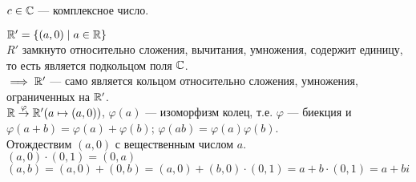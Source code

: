 \begin{normalsize}
\begin{defn}
    $c \in \mathbb{C}$ --- комплексное число.
\end{defn}

\begin{theorem-non}
    $\mathbb{R}' = \{(a, 0) \mid a \in \mathbb{R}\}$\\
    $R'$ замкнуто относительно сложения, вычитания, умножения, содержит единицу, то есть является подкольцом поля $\mathbb{C}$.\\
    $\implies \mathbb{R}'$ --- само является кольцом относительно сложения, умножения, ограниченных на $\mathbb{R}'$. \\
    $\mathbb{R} \overset{\varphi}{\to} \mathbb{R}'(a \mapsto (a, 0))$, $\varphi(a)$ --- изоморфизм колец, т.е. $\varphi$ --- биекция и $\varphi(a + b) = \varphi(a) + \varphi(b)$; $\varphi(ab) = \varphi(a)\varphi(b)$.\\
    Отождествим $(a, 0)$ с вещественным числом $a$.\\
    $(a, 0) \cdot (0, 1) = (0, a)$\\
    $(a, b) = (a, 0) + (0, b) = (a, 0) + (b, 0) \cdot (0, 1) = a + b \cdot (0, 1) = a + bi$\\
\end{theorem-non}

\end{normalsize}